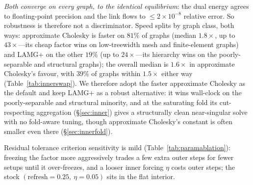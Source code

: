 \documentclass{siamart220329}
\begin{document}
\emph{Both converge on every graph, to the identical equilibrium}: the dual energy agrees to
floating-point precision and the link flows to $\le2\times10^{-8}$ relative error. So robustness is therefore not a discriminator. Speed splits by graph class, both ways: approximate Cholesky is faster on $81\%$ of
graphs (median $1.8\times$, up to $43\times$---its cheap factor wins on low-treewidth mesh and
finite-element graphs) and LAMG+ on the other $19\%$ (up to $24\times$---its hierarchy wins on the
poorly-separable and structural graphs); the overall median is $1.6\times$ in approximate Cholesky's favour, with
$39\%$ of graphs within $1.5\times$ either way (Table~\ref{tab:innerswap}). We therefore adopt the faster
approximate Cholesky as the default and keep LAMG+ as a
robust alternative: it wins wall-clock on the poorly-separable and structural minority, and at the
saturating fold its cut-respecting aggregation (\S\ref{sec:inner}) gives a structurally clean
near-singular solve with no fold-aware tuning, though approximate Cholesky's constant is often smaller
even there (\S\ref{sec:innerfold}). 

Residual tolerance criterion sensitivity is mild (Table~\ref{tab:paramablation}): freezing the factor more
aggressively trades a few extra outer steps for fewer setups until it over-freezes, and a looser inner
forcing $\eta$ costs outer steps; the stock $(\text{refresh}=0.25,\ \eta=0.05)$ sits in the flat
interior.
\end{document}
